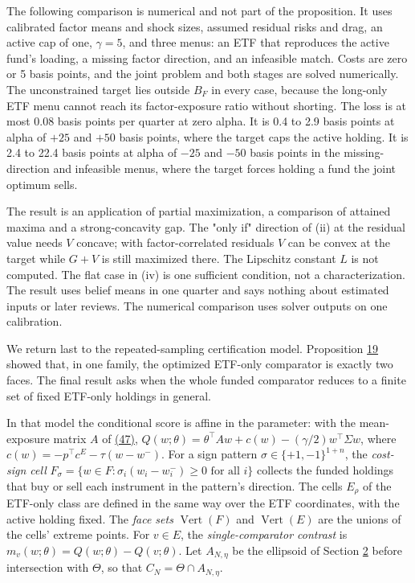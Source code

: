 \documentclass[11pt]{article}
\begin{document}
The following comparison is numerical and not part of the
proposition. It uses calibrated factor means and shock sizes,
assumed residual risks and drag, an active cap of one, \(\gamma=5\),
and three menus: an ETF that reproduces the active fund's loading, a
missing factor direction, and an infeasible match. Costs are zero
or 5 basis points, and the joint problem and both stages are solved
numerically. The unconstrained target lies outside \(B_F\) in every
case, because the long-only ETF menu cannot reach its
factor-exposure ratio without shorting. The loss is at most 0.08
basis points per quarter at zero alpha. It is 0.4 to 2.9 basis
points at alpha of \(+25\) and \(+50\) basis points, where the
target caps the active holding. It is 2.4 to 22.4 basis points at
alpha of \(-25\) and \(-50\) basis points in the missing-direction
and infeasible menus, where the target forces holding a fund the
joint optimum sells.

The result is an application of partial maximization, a comparison
of attained maxima and a strong-concavity gap. The "only if"
direction of (ii) at the residual value needs \(V\) concave; with
factor-correlated residuals \(V\) can be convex at the target while
\(G+V\) is still maximized there. The Lipschitz constant \(L\) is
not computed. The flat case in (iv) is one sufficient condition, not
a characterization. The result uses belief means in one quarter and
says nothing about estimated inputs or later reviews. The numerical
comparison uses solver outputs on one calibration.

We return last to the repeated-sampling certification model.
Proposition \hyperref[res:Proposition-19]{19} showed that, in one family, the optimized ETF-only
comparator is exactly two faces. The final result asks when the
whole funded comparator reduces to a finite set of fixed ETF-only
holdings in general.

In that model the conditional score is affine in the parameter:
with the mean-exposure matrix \(A\) of \hyperref[eq:47]{(47)},
\(Q(w;\theta)=\theta^\top Aw+c(w)-(\gamma/2)w^\top\Sigma w\), where
\(c(w)=-p^\top c^E-\tau(w-w^-)\). For a sign pattern
\(\sigma\in\{+1,-1\}^{1+n}\), the \emph{cost-sign cell}
\(F_\sigma=\{w\in F:\sigma_i(w_i-w^-_i)\geq0\text{ for all }i\}\)
collects the funded holdings that buy or sell each instrument in the
pattern's direction. The cells \(E_\rho\) of the ETF-only class are
defined in the same way over the ETF coordinates, with the active
holding fixed. The \emph{face sets} \(\operatorname{Vert}(F)\) and
\(\operatorname{Vert}(E)\) are the unions of the cells' extreme
points. For \(v\in E\), the \emph{single-comparator contrast} is
\(m_v(w;\theta)=Q(w;\theta)-Q(v;\theta)\). Let \(A_{N,\eta}\) be the
ellipsoid of Section \hyperref[sec:2]{2} before intersection with \(\Theta\), so that
\(C_N=\Theta\cap A_{N,\eta}\).
\end{document}
